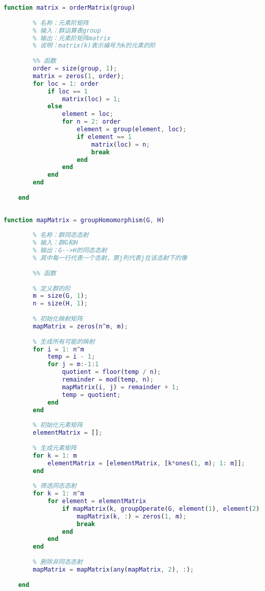 \begin{lstlisting}[language=Matlab, caption={元素阶矩阵}, label={orderMatrix}]
	function matrix = orderMatrix(group)
	
	    % 名称：元素阶矩阵
	    % 输入：群运算表group
	    % 输出：元素阶矩阵matrix
	    % 说明：matrix(k)表示编号为k的元素的阶
	
	    %% 函数
	    order = size(group, 1);
	    matrix = zeros(1, order);
	    for loc = 1: order
	        if loc == 1
	            matrix(loc) = 1;
	        else
	            element = loc;
	            for n = 2: order
	                element = group(element, loc);
	                if element == 1
	                    matrix(loc) = n;
	                    break
	                end
	            end
	        end
	    end
	
	end
	
\end{lstlisting}

\begin{lstlisting}[language=Matlab, caption={群同态态射}, label={groupHomomorphism}]
	function mapMatrix = groupHomomorphism(G, H)
	
	    % 名称：群同态态射
	    % 输入：群G和H
	    % 输出：G-->H的同态态射
	    % 其中每一行代表一个态射，第j列代表j在该态射下的像
	
	    %% 函数
	    
	    % 定义群的阶
	    m = size(G, 1);
	    n = size(H, 1);
	
	    % 初始化映射矩阵
	    mapMatrix = zeros(n^m, m);
	    
	    % 生成所有可能的映射
	    for i = 1: n^m
	        temp = i - 1;
	        for j = m:-1:1
	            quotient = floor(temp / n);
	            remainder = mod(temp, n);
	            mapMatrix(i, j) = remainder + 1;
	            temp = quotient;
	        end
	    end
	
	    % 初始化元素矩阵
	    elementMatrix = [];
	
	    % 生成元素矩阵
	    for k = 1: m
	        elementMatrix = [elementMatrix, [k*ones(1, m); 1: m]];
	    end
	
	    % 筛选同态态射
	    for k = 1: n^m
	        for element = elementMatrix
	            if mapMatrix(k, groupOperate(G, element(1), element(2))) ~= groupOperate(H, mapMatrix(k, element(1)), mapMatrix(k, element(2)))
	                mapMatrix(k, :) = zeros(1, m);
	                break
	            end
	        end
	    end
	
	    % 删除非同态态射
	    mapMatrix = mapMatrix(any(mapMatrix, 2), :);
	
	end
	
\end{lstlisting}

